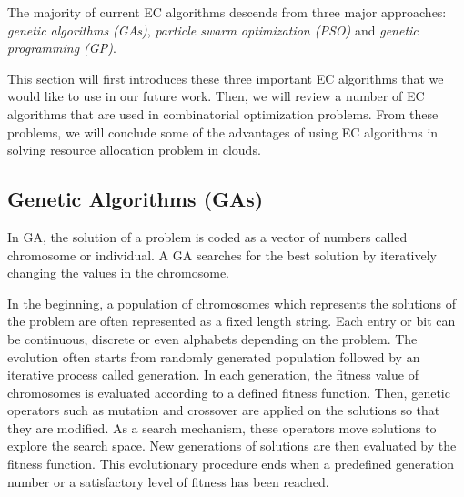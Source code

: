  The majority of current EC algorithms descends from three major approaches: \emph{genetic algorithms (GAs)}, \emph{particle swarm optimization (PSO)} and \emph{genetic programming (GP)}. 


This section will first introduces these three important EC algorithms that we would like to use in our future work. Then, we will review a number of EC algorithms that are used in combinatorial optimization problems. From these problems, we will conclude some of the advantages of using EC algorithms in solving resource allocation problem in clouds.

\subsection{Genetic Algorithms (GAs)}
 In GA, the solution of a problem is coded as a vector of numbers called chromosome or individual. A GA searches for the best solution by iteratively changing the values in the chromosome. 

 In the beginning, a population of chromosomes which represents the solutions of the problem are often represented as a fixed length string. Each entry or bit can be continuous, discrete or even alphabets depending on the problem.  The evolution often starts from randomly generated population followed by an iterative process called generation.  In each generation, the fitness value of chromosomes is evaluated according to a defined fitness function.  Then, genetic operators such as mutation and crossover are applied on the solutions so that they are modified. As a search mechanism, these operators move solutions to explore the search space. New generations of solutions are then evaluated by the fitness function.  This evolutionary procedure ends when a predefined generation number or a satisfactory level of fitness has been reached.

